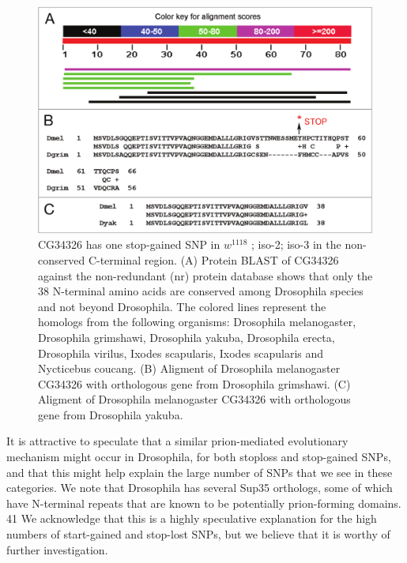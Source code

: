 \begin{figure}
    \centering
    \includegraphics[width=14cm]{snpeff_fig4.png}
    \caption{
CG34326 has one stop-gained SNP in $w^{1118}$ ; iso-2; iso-3 in the non-conserved C-terminal region. (A) Protein BLAST of CG34326 against the non-redundant (nr) protein database shows that only the 38 N-terminal amino acids are conserved among Drosophila species and not beyond Drosophila. The colored lines represent the homologs from the following organisms: Drosophila melanogaster, Drosophila grimshawi, Drosophila yakuba, Drosophila erecta, Drosophila virilus, Ixodes
scapularis, Ixodes scapularis and Nycticebus coucang. (B) Aligment of Drosophila melanogaster CG34326 with orthologous gene from Drosophila grimshawi. (C) Aligment of Drosophila melanogaster CG34326 with orthologous gene from Drosophila yakuba.}
    \label{fig:snpeffTab3}
\end{figure}

It is attractive to speculate that a similar prion-mediated evolutionary mechanism might occur in Drosophila, for both stoploss and stop-gained SNPs, and that this might help explain the large number of SNPs that we see in these categories. We note that Drosophila has several Sup35 orthologs, some of which have N-terminal repeats that are known to be potentially prion-forming domains. 41 We acknowledge that this is a highly speculative explanation for the high numbers of start-gained and stop-lost SNPs, but we believe that it is worthy of further investigation.

